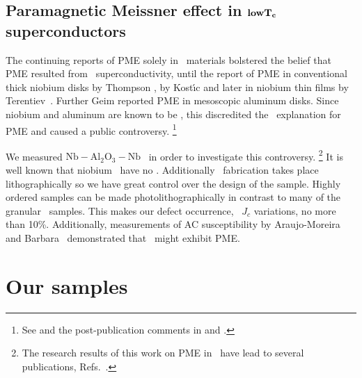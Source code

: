 \subsection[Paramagnetic Meissner effect in \lowtc\ superconductors]
{Paramagnetic Meissner effect in $\mathbf{low T_c}$ superconductors}

The continuing reports of PME solely in \hightc\ materials bolstered the 
belief that PME resulted from \dwave\ superconductivity, until the report 
of PME in conventional thick niobium disks by Thompson \etal
\cite{thompson_prl_75_529_1995}, by Kost\'{\i}c \etal
\cite{kostic_prb_53_791_1996} and later in niobium thin films by
Terentiev \etal\,\cite{terentiev_prb_60_r761_1999}. 
Further Geim \etal
\cite{geim_nature_396_144_1998} reported 
PME in mesoscopic 
aluminum disks.
Since niobium and aluminum are known to be \swave, this
discredited the \dwave\ explanation
for PME and caused a public controversy.%
\footnote{See  and the 
post-publication comments in  
and .} 

We measured $\mathrm{Nb}-\mathrm{Al}_2\mathrm{O}_3-\mathrm{Nb}$
\jjas\ in order to investigate this controversy.%
\footnote{The research results of this work on PME in \jjas\ have 
lead to several publications, Refs.~\cite{nielsen_rdv_75_1999,%
nielsen_physb_280_444_2000,nielsen_prb_62_14380_2000,deleo_unpublished}.}
It is well known that 
niobium \jjas\
have no \pijunctions. Additionally
\jja\ fabrication takes place lithographically so we have great
control over the design of the sample. 
Highly ordered samples can be made photolithographically
in contrast to many of the granular \hightc\ 
samples. This makes our defect occurrence, \eg\ $J_c$ 
variations, no more than 10\%. Additionally, measurements of AC
susceptibility by
Araujo-Moreira \etal\,
\cite{araujo_prl_78_4625_1997} and 
Barbara \etal\,\cite{barbara_prb_60_7489_1999} demonstrated 
that \jjas\ might exhibit
PME. 

\section{Our samples}
\label{sec:sample_description}

